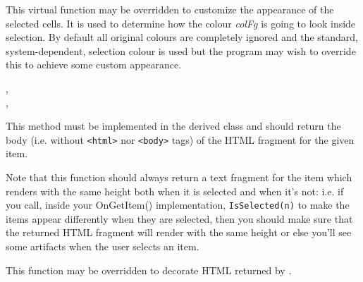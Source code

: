 


\label{wxhtmllistboxgetselectedtextcolour}


This virtual function may be overridden to customize the appearance of the
selected cells. It is used to determine how the colour {\it colFg} is going to
look inside selection. By default all original colours are completely ignored
and the standard, system-dependent, selection colour is used but the program
may wish to override this to achieve some custom appearance.


,\\
,\\


\label{wxhtmllistboxongetitem}


This method must be implemented in the derived class and should return
the body (i.e. without {\tt <html>} nor {\tt <body>} tags) of the HTML fragment
for the given item.

Note that this function should always return a text fragment for the  item
which renders with the same height both when it is selected and when it's not:
i.e. if you call, inside your OnGetItem() implementation, {\tt IsSelected(n)} to
make the items appear differently when they are selected, then you should make sure
that the returned HTML fragment will render with the same height or else you'll
see some artifacts when the user selects an item.

\label{wxhtmllistboxongetitemmarkup}


This function may be overridden to decorate HTML returned by
.

\label{wxhtmlistboxonlinkclicked}

